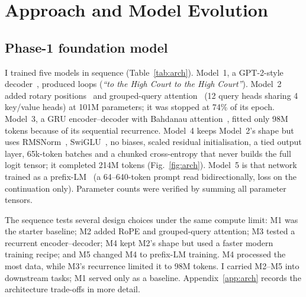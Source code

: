 \documentclass[11pt, oneside]{article}
\begin{document}
\section{Approach and Model Evolution}\label{sec:approach}
\subsection{Phase-1 foundation model}\label{sec:p1}
I trained five models in sequence (Table~\ref{tab:arch}). Model~1, a GPT-2-style decoder~\cite{radford2019gpt2},
produced loops (\emph{``to the High Court to the High Court''}). Model~2 added rotary positions~\cite{rope} and
grouped-query attention~\cite{gqa} (12 query heads sharing 4 key/value heads) at 101M parameters; it was stopped at 74\%
of its epoch. Model~3, a GRU encoder--decoder with Bahdanau attention~\cite{bahdanau}, fitted only 98M tokens because of
its sequential recurrence. Model~4 keeps Model~2's shape but uses RMSNorm~\cite{rmsnorm}, SwiGLU~\cite{swiglu}, no
biases, scaled residual initialisation, a tied output layer, 65k-token batches and a chunked cross-entropy that never
builds the full logit tensor; it completed 214M tokens (Fig.~\ref{fig:arch}). Model~5 is that network trained as a
prefix-LM~\cite{t5} (a 64--640-token prompt read bidirectionally, loss on the continuation only). Parameter counts were
verified by summing all parameter tensors.

The sequence tests several design choices under the same compute limit: M1 was the starter baseline; M2 added RoPE
and grouped-query attention; M3 tested a recurrent encoder--decoder; M4 kept M2's shape but used a faster modern
training recipe; and M5 changed M4 to prefix-LM training. M4 processed the most data, while M3's recurrence limited
it to 98M tokens. I carried M2--M5 into downstream tasks; M1 served only as a baseline. Appendix~\ref{app:arch}
records the architecture trade-offs in more detail.
\end{document}
